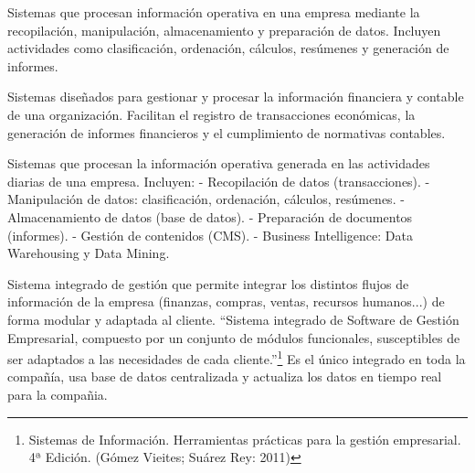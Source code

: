\documentclass[12pt]{report} %
\begin{document}
\begin{definicion}
Sistemas que procesan información operativa en una empresa mediante la recopilación, manipulación, almacenamiento y preparación de datos. Incluyen actividades como clasificación, ordenación, cálculos, resúmenes y generación de informes.
\end{definicion}

\begin{definicion}
Sistemas diseñados para gestionar y procesar la información financiera y contable de una organización. Facilitan el registro de transacciones económicas, la generación de informes financieros y el cumplimiento de normativas contables.
\end{definicion}

\begin{definicion}
Sistemas que procesan la información operativa generada en las actividades diarias de una empresa. Incluyen:
- Recopilación de datos (transacciones).
- Manipulación de datos: clasificación, ordenación, cálculos, resúmenes.
- Almacenamiento de datos (base de datos).
- Preparación de documentos (informes).
- Gestión de contenidos (CMS).
- Business Intelligence: Data Warehousing y Data Mining.
\end{definicion}

\begin{definicion}
Sistema integrado de gestión que permite integrar los distintos flujos de información de la empresa (finanzas, compras, ventas, recursos humanos...) de forma modular y adaptada al cliente. “Sistema integrado de Software de Gestión Empresarial, compuesto por un conjunto de módulos funcionales, susceptibles de ser adaptados a las necesidades de cada cliente.”\footnote{Sistemas de Información. Herramientas prácticas para la gestión empresarial. 4ª Edición. (Gómez Vieites; Suárez Rey: 2011)} Es el único integrado en toda la compañía, usa base de datos centralizada y actualiza los datos en tiempo real para la compañia.
\end{definicion}
\end{document}

